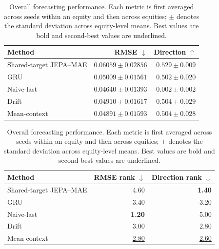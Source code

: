 \begin{table}[t]
\centering
\small
\caption{Overall forecasting performance. Each metric is first averaged across seeds within an equity and then across equities; $\pm$ denotes the standard deviation across equity-level means. Best values are bold and second-best values are underlined.}
\label{tab:main_metrics}
\begin{tabular}{lrr}
\toprule
Method & RMSE $\downarrow$ & Direction $\uparrow$ \\
\midrule
Shared-target JEPA--MAE & $0.06059 \pm 0.02856$ & \textbf{$0.529 \pm 0.009$} \\
GRU & $0.05009 \pm 0.01561$ & $0.502 \pm 0.020$ \\
Naive-last & \textbf{$0.04640 \pm 0.01393$} & $0.002 \pm 0.002$ \\
Drift & $0.04910 \pm 0.01617$ & \underline{$0.504 \pm 0.029$} \\
Mean-context & \underline{$0.04891 \pm 0.01593$} & \underline{$0.504 \pm 0.028$} \\
\bottomrule
\end{tabular}
\par\medskip
\begin{tabular}{lrr}
\toprule
Method & RMSE rank $\downarrow$ & Direction rank $\downarrow$ \\
\midrule
Shared-target JEPA--MAE & 4.60 & \textbf{1.40} \\
GRU & 3.40 & 3.20 \\
Naive-last & \textbf{1.20} & 5.00 \\
Drift & 3.00 & 2.80 \\
Mean-context & \underline{2.80} & \underline{2.60} \\
\bottomrule
\end{tabular}
\end{table}
